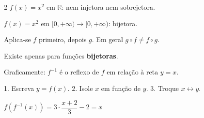 \documentclass[12pt,twoside]{article}
\begin{document}
\begin{multicols}{2}
$f(x) = x^2$ em $\mathbb{R}$: nem injetora nem sobrejetora.

$f(x) = x^2$ em $[0,+\infty) \to [0,+\infty)$: bijetora.



Aplica-se $f$ primeiro, depois $g$. Em geral $g \circ f \neq f \circ g$.




Existe apenas para funções \textbf{bijetoras}.


Graficamente: $f^{-1}$ é o reflexo de $f$ em relação à reta $y = x$.


1. Escreva $y = f(x)$.
2. Isole $x$ em função de $y$.
3. Troque $x \leftrightarrow y$.




$f(f^{-1}(x)) = 3 \cdot \dfrac{x+2}{3} - 2 = x$ \checkmark


\end{multicols}


\end{document}
